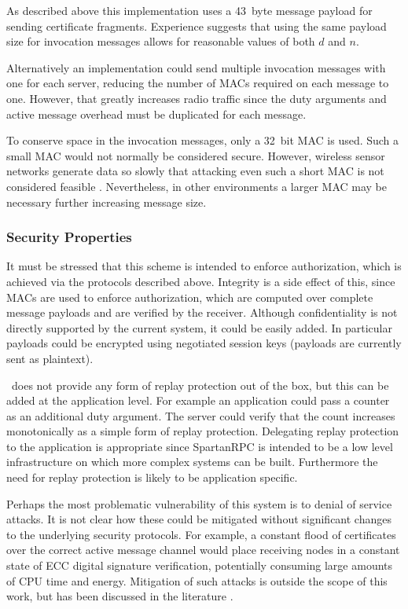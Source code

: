 As described above this implementation uses a 43~byte message payload for sending certificate
fragments. Experience suggests that using the same payload size for invocation messages
allows for reasonable values of both $d$ and $n$.

Alternatively an implementation could send multiple invocation messages with one for each
server, reducing the number of MACs required on each message to one. However, that greatly
increases radio traffic since the duty arguments and active message overhead must be duplicated
for each message.

To conserve space in the invocation messages, only a 32~bit MAC is used. Such a small MAC would
not normally be considered secure. However, wireless sensor networks generate data so slowly
that attacking even such a short MAC is not considered feasible
\cite{karlog-tinysec-2004,luk-minisec-2007}. Nevertheless, in other environments a larger MAC may be
necessary further increasing message size.


\subsubsection{Security Properties}
\label{section-security-properties}

It must be stressed that this scheme is intended to enforce authorization, which is achieved via the
protocols described above. Integrity is a side effect of this, since MACs are used to enforce
authorization, which are computed over complete message payloads and are verified by the
receiver. Although confidentiality is not directly supported by the current system, it could be
easily added. In particular payloads could be encrypted using negotiated session keys (payloads
are currently sent as plaintext).

\Sprocket\ does not provide any form of replay protection out of the box, but this can be added
at the application level. For example an application could pass a counter as an additional duty
argument. The server could verify that the count increases monotonically as a simple form of
replay protection. Delegating replay protection to the application is appropriate since
SpartanRPC is intended to be a low level infrastructure on which more complex systems can be
built. Furthermore the need for replay protection is likely to be application specific.

Perhaps the most problematic vulnerability of this system is to denial of service attacks. It is
not clear how these could be mitigated without significant changes to the underlying security
protocols. For example, a constant flood of certificates over the correct active message channel
would place receiving nodes in a constant state of ECC digital signature verification,
potentially consuming large amounts of CPU time and energy. Mitigation of such attacks is
outside the scope of this work, but has been discussed in the literature \cite{4431860}.

